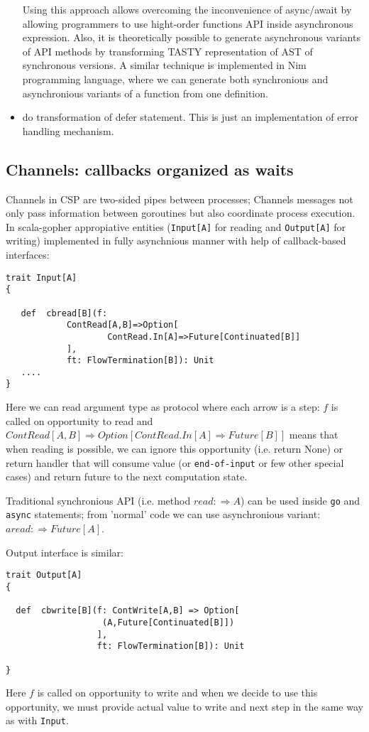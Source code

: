 \documentclass[12pt]{article}
\newcommand{\To}{\Rightarrow}
\begin{document}
\begin{itemize}
 Using this approach allows overcoming the inconvenience of async/await by allowing programmers to use hight-order functions API inside asynchronous expression. Also, it is theoretically possible to generate asynchronous variants of API methods by transforming TASTY\cite{TASTY} representation of AST of synchronous versions. A similar technique is implemented in Nim \cite{Nim} programming language, where we can generate both synchronious and asynchronious variants of a function from one definition.
  
 \item do transformation of defer statement. This is just an implementation of error handling mechanism.

\end{itemize}

\subsection{Channels: callbacks organized as waits}

  Channels in CSP are two-sided pipes between processes; Channels messages not only pass information between goroutines but also coordinate process execution.
  In scala-gopher appropiative entities (\verb|Input[A]| for reading and \verb|Output[A]| for writing) implemented in fully asynchnious manner with help of callback-based interfaces:

\begin{Verbatim}[fontsize=\small]
trait Input[A]
{

   def  cbread[B](f:
            ContRead[A,B]=>Option[
                    ContRead.In[A]=>Future[Continuated[B]]
            ],
            ft: FlowTermination[B]): Unit
   ....
}
\end{Verbatim}

  Here we can read argument type as protocol where each arrow is a step: 
    $f$ is called on opportunity to read and
      $ContRead[A,B] \To Option[ContRead.In[A] \To Future[B]]$ means that when reading is 
   possible, we can ignore this opportunity (i.e. return None) or return handler that will
   consume value (or \verb|end-of-input| or few other special cases) and return future to the next 
   computation state.

  Traditional synchronious API  (i.e. method $read:\To A$) can be used inside \verb|go| and \verb|async| statements; from 'normal' code we can use asynchronious variant: $aread: \To Future[A]$.

  Output interface is similar:
\begin{Verbatim}[fontsize=\small]
trait Output[A] 
{

  def  cbwrite[B](f: ContWrite[A,B] => Option[
                   (A,Future[Continuated[B]])
                  ],
                  ft: FlowTermination[B]): Unit
  
}
\end{Verbatim}
  Here $f$ is called on opportunity to write and when we decide to use this opportunity, we
 must provide actual value to write and next step in the same way as with \verb|Input|.
\end{document}

